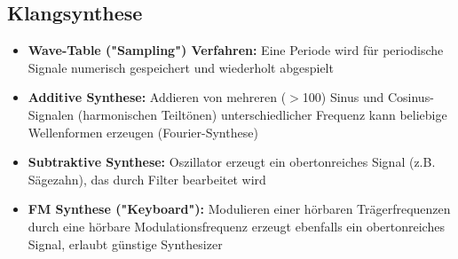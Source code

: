 \documentclass[12pt,landscape]{article}
\begin{document}
\begin{multicols}{3}
\begin{itemize}
\end{itemize}
\subsection{Klangsynthese}
\begin{itemize}
\item \textbf{Wave-Table ("Sampling") Verfahren:} Eine Periode wird für periodische Signale numerisch gespeichert und wiederholt abgespielt
\item \textbf{Additive Synthese:} Addieren von mehreren ($>$100) Sinus und Cosinus-Signalen (harmonischen Teiltönen) unterschiedlicher Frequenz kann beliebige Wellenformen erzeugen (Fourier-Synthese)
\item \textbf{Subtraktive Synthese:} Oszillator erzeugt ein obertonreiches Signal (z.B. Sägezahn), das durch Filter bearbeitet wird
\item \textbf{FM Synthese ("Keyboard"):} Modulieren einer hörbaren Trägerfrequenzen durch eine hörbare Modulationsfrequenz erzeugt ebenfalls ein obertonreiches Signal, erlaubt günstige Synthesizer
\end{itemize}

\end{multicols}
\end{document}
